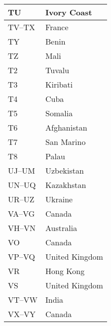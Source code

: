 \begin{longtable}{|l|l|}
  \hline
  TU                  & Ivory Coast                               \\
  \hline
  TV--TX              & France                                    \\
  \hline
  TY                  & Benin                                     \\
  \hline
  TZ                  & Mali                                      \\
  \hline
  T2                  & Tuvalu                                    \\
  \hline
  T3                  & Kiribati                                  \\
  \hline
  T4                  & Cuba                                      \\
  \hline
  T5                  & Somalia                                   \\
  \hline
  T6                  & Afghanistan                               \\
  \hline
  T7                  & San Marino                                \\
  \hline
  T8                  & Palau                                     \\
  \hline
  UJ--UM              & Uzbekistan                                \\
  \hline
  UN--UQ              & Kazakhstan                                \\
  \hline
  UR--UZ              & Ukraine                                   \\
  \hline
  VA--VG              & Canada                                    \\
  \hline
  VH--VN              & Australia                                 \\
  \hline
  VO                  & Canada                                    \\
  \hline
  VP--VQ              & United Kingdom                            \\
  \hline
  VR                  & Hong Kong                                 \\
  \hline
  VS                  & United Kingdom                            \\
  \hline
  VT--VW              & India                                     \\
  \hline
  VX--VY              & Canada                                    \\
  \hline

\end{longtable}
